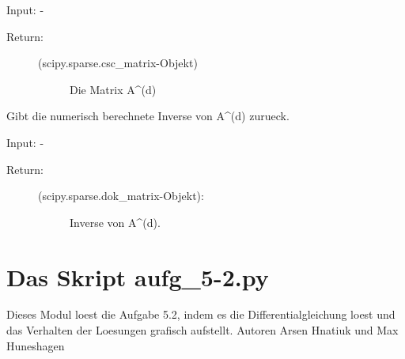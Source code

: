 \documentclass[letterpaper,10pt,ngerman]{sphinxmanual}
\begin{document}
\begin{fulllineitems}
\begin{fulllineitems}
Input: -
\begin{description}
\item[{Return:}] \leavevmode\begin{description}
\item[{(scipy.sparse.csc\_matrix-Objekt)}] \leavevmode
Die Matrix A\textasciicircum{}(d)

\end{description}

\end{description}

\end{fulllineitems}


\begin{fulllineitems}
\label{\detokenize{index:sparse_erw.Sparse.return_mat_d_inv}}
Gibt die numerisch berechnete Inverse von A\textasciicircum{}(d) zurueck.

Input: -
\begin{description}
\item[{Return:}] \leavevmode\begin{description}
\item[{(scipy.sparse.dok\_matrix-Objekt):}] \leavevmode
Inverse von A\textasciicircum{}(d).

\end{description}

\end{description}

\end{fulllineitems}


\end{fulllineitems}



\chapter{Das Skript aufg\_5-2.py}
\label{\detokenize{index:module-aufg_5_2}}\label{\detokenize{index:das-skript-aufg-5-2-py}}
Dieses Modul loest die Aufgabe 5.2, indem es die Differentialgleichung loest und
das Verhalten der Loesungen grafisch aufstellt.
Autoren Arsen Hnatiuk und Max Huneshagen
\end{document}
